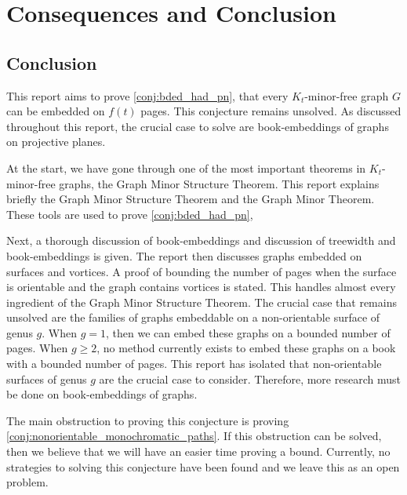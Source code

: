 \chapter{Consequences and Conclusion}\label{chap:conclusion}



\section{Conclusion}
This report aims to prove \cref{conj:bded_had_pn}, that every $K_t$-minor-free graph $G$ can be embedded on $f(t)$ pages. This conjecture remains unsolved. 
As discussed throughout this report, the crucial case to solve are book-embeddings of graphs on projective planes. 

At the start, we have gone through one of the most important theorems in $K_t$-minor-free graphs, the Graph Minor Structure Theorem. This report explains briefly the Graph Minor Structure Theorem and the Graph Minor Theorem. 
These tools are used to prove \cref{conj:bded_had_pn},

Next, a thorough discussion of book-embeddings and discussion of treewidth and book-embeddings is given. The report then discusses graphs embedded on surfaces and vortices. A proof of bounding the number of pages when the surface is orientable and the graph contains vortices is stated. This handles almost every ingredient of the Graph Minor Structure Theorem. The crucial case that remains unsolved are the families of graphs embeddable on a non-orientable surface of genus $g$. When $g = 1$, then we can embed these graphs on a bounded number of pages. When $g \geq 2$, no method currently exists to embed these graphs on a book with a bounded number of pages. This report has isolated that non-orientable surfaces of genus $g$ are the crucial case to consider. Therefore, more research must be done on book-embeddings of graphs. 

The main obstruction to proving this conjecture is proving \cref{conj:nonorientable_monochromatic_paths}. If this obstruction can be solved, then we believe that we will have an easier time proving a bound. Currently, no strategies to solving this conjecture have been found and we leave this as an open problem. 
